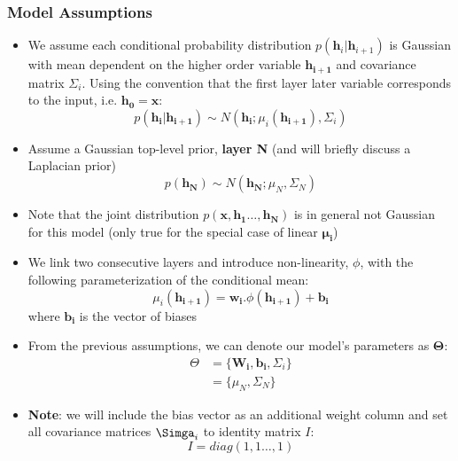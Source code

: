 \documentclass[main]{subfiles}
\begin{document}
\subsubsection{Model Assumptions}
\begin{itemize}
    \item We assume each conditional probability distribution $p(\bm{h}_i|\bm{h}_{i+1})$ is Gaussian with mean dependent on the higher order variable $\bm{h_{i+1}}$ and covariance matrix $\Sigma_i$. Using the convention that the first layer later variable corresponds to the input, i.e. $\bm{h_0} = \bm{x}$:
        \begin{equation}
            p(\bm{h_i}|\bm{h_{i+1}}) \sim N(\bm{h_i}; \mu_i(\bm{h_{i+1}}), \Sigma_i)
        \end{equation}
        
    \item Assume a Gaussian top-level prior, \textbf{layer N} (and will briefly discuss a Laplacian prior)
       \begin{equation}
            p(\bm{h_N}) \sim N(\bm{h_N}; \mu_N, \Sigma_N)
        \end{equation}
    \item Note that the joint distribution $p(\bm{x},\bm{h_1}\dots, \bm{h_N})$ is in general not Gaussian for this model (only true for the special case of linear $\bm{\mu_i}$)
    
    \item We link two consecutive layers and introduce non-linearity, $\phi$, with the following parameterization of the conditional mean:
        \begin{equation}
            \mu_i(\bm{h_{i+1}}) = \bm{w_{i}}. \phi(\bm{h_{i+1}}) + \bm{b_i}
        \end{equation}
        where $\bm{b_i}$ is the vector of biases
    
    \item From the previous assumptions, we can denote our model's parameters as $\bm{\Theta}$:
        \begin{equation}
            \begin{split}
                 \Theta &= \big\{ \bm{W_i}, \bm{b_i}, \Sigma_i\} \\
                        &= \{ \mu_N, \Sigma_N\} 
            \end{split}
        \end{equation}
    \item \textbf{Note}: we will include the bias vector as an additional weight column and set all covariance matrices $\Simga_i$ to identity matrix $I$:
        \begin{equation}
            I= diag(1,1 \dots , 1)
        \end{equation}
        
\end{itemize}
\end{document}
